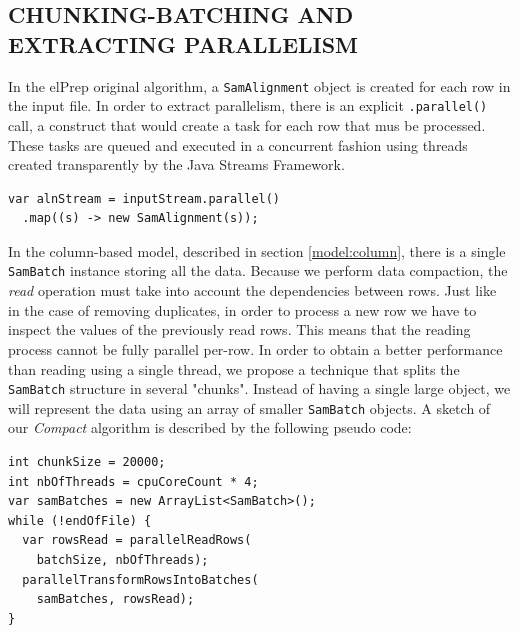 \documentclass[a4paper,twoside]{article}
\begin{document}
\subsection{\uppercase{Chunking-Batching and Extracting Parallelism}}
In the elPrep original algorithm, a {\tt SamAlignment} object is created for each row in the input file. 
In order to extract parallelism, there is an explicit {\tt .parallel()} call, a construct that would create a task for each row that mus be processed. These tasks are queued and executed in a concurrent fashion using threads created transparently by the Java Streams Framework.
\begin{verbatim}
var alnStream = inputStream.parallel()
  .map((s) -> new SamAlignment(s));
\end{verbatim}
In the column-based model, described in section \ref{model:column}, there is a single {\tt SamBatch} instance storing all the data. Because we perform data compaction, the {\it read} operation must take into account the dependencies between rows. Just like in the case of removing duplicates, in order to process a new  row we have to inspect the values of the previously read rows.
This means that the reading process cannot be fully parallel per-row.
In order to obtain a better performance than reading using a single thread, we propose a technique that splits the {\tt SamBatch} structure in several "chunks". Instead of having a single large object, we will represent the data using an array of smaller {\tt SamBatch} objects.
A sketch of our {\it Compact} algorithm is described by the following pseudo code:

\begin{verbatim}
int chunkSize = 20000;
int nbOfThreads = cpuCoreCount * 4;
var samBatches = new ArrayList<SamBatch>();
while (!endOfFile) {
  var rowsRead = parallelReadRows(
    batchSize, nbOfThreads);
  parallelTransformRowsIntoBatches(
    samBatches, rowsRead);
}
\end{verbatim}
\end{document}

